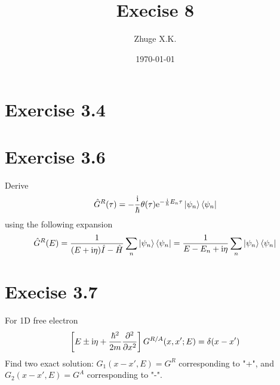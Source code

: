 \documentclass[11pt,a4paper]{article}
\title{Execise 8}
\author{Zhuge X.K.}
\date{\today}
\theoremstyle{plain}
\theoremstyle{definition}
\theoremstyle{remark}
\newcommand{\ii}{\mathrm{i}}                      %
\newcommand{\eexp}{\mathrm{e}}                    %
\begin{document}
\maketitle
\section*{Exercise 3.4}
\section*{Exercise 3.6}
Derive
\begin{equation*}
    \hat{G}^R(\tau) = -\frac{\ii}{\hbar}\theta(\tau)\eexp^{-\frac{\ii}{\hbar}E_n\tau}\ket{\psi_n}\bra{\psi_n}
\end{equation*}
using the following expansion
\begin{equation*}
    \hat{G}^R(E) = \frac{1}{(E + \ii \eta)\hat{I}-\hat{H}}\sum_n \ket{\psi_n}\bra{\psi_n} = \frac{1}{E - E_n + \ii\eta}\sum_n \ket{\psi_n}\bra{\psi_n}
\end{equation*}
\section*{Execise 3.7}
For 1D free electron
\begin{equation*}
    \left[ E \pm \ii \eta + \frac{\hbar^2}{2m}\pdv{^2}{x^2} \right]G^{R/A}(x,x';E) = \delta(x-x')
\end{equation*}
Find two exact solution: $G_1(x-x',E) = G^R$ corresponding to "+", and $G_2(x-x',E) = G^A$ corresponding to "-".
\end{document}
